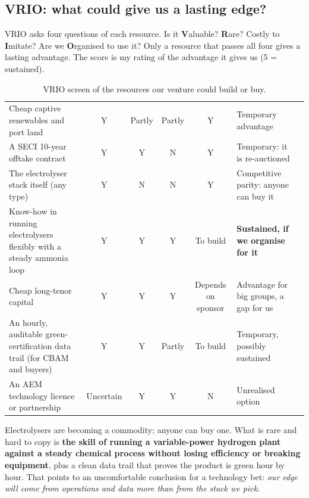 \subsection{VRIO: what could give us a lasting edge?}

VRIO asks four questions of each resource. Is it \textbf{V}aluable? \textbf{R}are? Costly to \textbf{I}mitate? Are we \textbf{O}rganised to use it? Only a resource that passes all four gives a lasting advantage. The score is my rating of the advantage it gives us (5 = sustained).

\begin{table}[H]\centering\tablefont
\caption{VRIO screen of the resources our venture could build or buy.}
\begin{tabularx}{\textwidth}{@{}L c c c c L c@{}}
\toprule
{} &  &  &  &  &  & \\ \midrule
Cheap captive renewables and port land & Y & Partly & Partly & Y & Temporary advantage & \\
A SECI 10-year offtake contract & Y & Y & N & Y & Temporary: it is re-auctioned & \\
The electrolyser stack itself (any type) & Y & N & N & Y & Competitive parity: anyone can buy it & \\
Know-how in running electrolysers flexibly with a steady ammonia loop & Y & Y & Y & To build & \textbf{Sustained, if we organise for it} & \\
Cheap long-tenor capital & Y & Y & Y & Depends on sponsor & Advantage for big groups, a gap for us & \\
An hourly, auditable green-certification data trail (for CBAM and buyers) & Y & Y & Partly & To build & Temporary, possibly sustained & \\
An AEM technology licence or partnership & Uncertain & Y & Y & N & Unrealised option & \\
\bottomrule
\end{tabularx}
\end{table}

\begin{finding}
Electrolysers are becoming a commodity; anyone can buy one. What is rare and hard to copy is \textbf{the skill of running a variable-power hydrogen plant against a steady chemical process without losing efficiency or breaking equipment}, plus a clean data trail that proves the product is green hour by hour. That points to an uncomfortable conclusion for a technology bet: \emph{our edge will come from operations and data more than from the stack we pick.} \confM
\end{finding}

